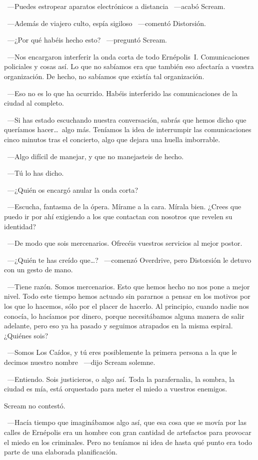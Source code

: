 ~---Puedes estropear aparatos electrónicos a distancia ~---acabó Scream.

~---Además de viajero culto, espía sigiloso ~---comentó Distorsión.

~---¿Por qué habéis hecho esto? ~---preguntó Scream.

~---Nos encargaron interferir la onda corta de todo Ernépolis~I. Comunicaciones policiales y cosas así. Lo que no sabíamos era que también eso afectaría a vuestra organización. De hecho, no sabíamos que existía tal organización.

~---Eso no es lo que ha ocurrido. Habéis interferido las comunicaciones de la ciudad al completo.

~---Si has estado escuchando nuestra conversación, sabrás que hemos dicho que queríamos hacer\dots\ algo más. Teníamos la idea de interrumpir las comunicaciones cinco minutos tras el concierto, algo que dejara una huella imborrable.

~---Algo difícil de manejar, y que no manejasteis de hecho.

~---Tú lo has dicho.

~---¿Quién os encargó anular la onda corta?

~---Escucha, fantasma de la ópera. Mírame a la cara. Mírala bien. ¿Crees que puedo ir por ahí exigiendo a los que contactan con nosotros que revelen su identidad?

~---De modo que sois mercenarios. Ofrecéis vuestros servicios al mejor postor.

~---¿Quién te has creído que\dots? ~---comenzó Overdrive, pero Distorsión le detuvo con un gesto de mano.

~---Tiene razón. Somos mercenarios. Esto que hemos hecho no nos pone a mejor nivel. Todo este tiempo hemos actuado sin pararnos a pensar en los motivos por los que lo hacemos, sólo por el placer de hacerlo. Al principio, cuando nadie nos conocía, lo hacíamos por dinero, porque necesitábamos alguna manera de salir adelante, pero eso ya ha pasado y seguimos atrapados en la misma espiral. ¿Quiénes sois?

~---Somos Los Caídos, y tú eres posiblemente la primera persona a la que le decimos nuestro nombre ~---dijo Scream solemne.

~---Entiendo. Sois justicieros, o algo así. Toda la parafernalia, la sombra, la ciudad es mía, está orquestado para meter el miedo a vuestros enemigos.

Scream no contestó.

~---Hacía tiempo que imaginábamos algo así, que esa cosa que se movía por las calles de Ernépolis era un hombre con gran cantidad de artefactos para provocar el miedo en los criminales. Pero no teníamos ni idea de hasta qué punto era todo parte de una elaborada planificación.

